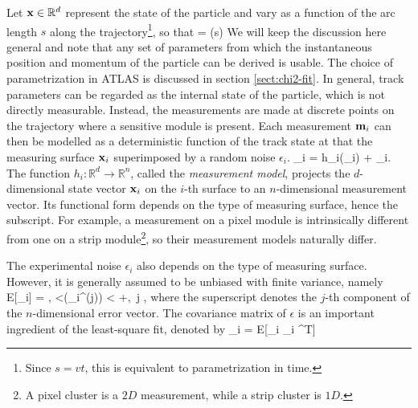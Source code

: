 Let $\mathbf{x}\in \mathbb{R}^d$ represent the state of the particle and vary as a function of the arc length $s$ along the trajectory\footnote{Since $s=vt$, this is equivalent to parametrization in time.}, so that 
\beq
\label{eq:track-fit:1}
\bfx = \bfx(s)
\eeq
We will keep the discussion here general and note that any set of parameters from which the instantaneous position and momentum of the particle can be derived is usable. 
The choice of parametrization in ATLAS is discussed in section \ref{sect:chi2-fit}.
In general, track parameters can be regarded as the internal state of the particle, which is not directly measurable.
Instead, the measurements are made at discrete points on the trajectory where a sensitive module is present.
Each measurement $\mathbf{m}_i$ can then be modelled as a deterministic function of the track state at that the measuring surface $\mathbf{x}_i$ superimposed by a random noise $\epsilon_i$.
\beq
\label{eq:track-fit:2}
\bfm_i = h_i(\bfx_i) + \epsilon_i.
\eeq
The function $h_i:\mathbb{R}^d \rightarrow \mathbb{R}^n$, called the \textit{measurement model}, 
projects the $d$-dimensional state vector $\mathbf{x}_i$ on the $i$-th surface to an $n$-dimensional measurement vector. 
Its functional form depends on the type of measuring surface, hence the subscript.
For example, a measurement on a pixel module is intrinsically different from one on a strip module\footnote{A pixel cluster is a $2D$ measurement, 
while a strip cluster is $1D$.}, so their measurement models naturally differ. 

The experimental noise $\epsilon_i$ also depends on the type of measuring surface. 
However, it is generally assumed to be unbiased with finite variance, namely
\beq
\label{eq:track-fit:3}
E[\epsilon_i] = , <\sigma(\epsilon_i^{(j)}) < +\infty ,\forall \, j \in [n],
\eeq
where the superscript denotes the $j$-th component of the $n$-dimensional error vector.
The covariance matrix of $\epsilon$ is an important ingredient of the least-square fit, denoted by
\beq
\label{eq:track-fit:4}
_i = E[\epsilon_i \epsilon_i ^T]
\eeq

